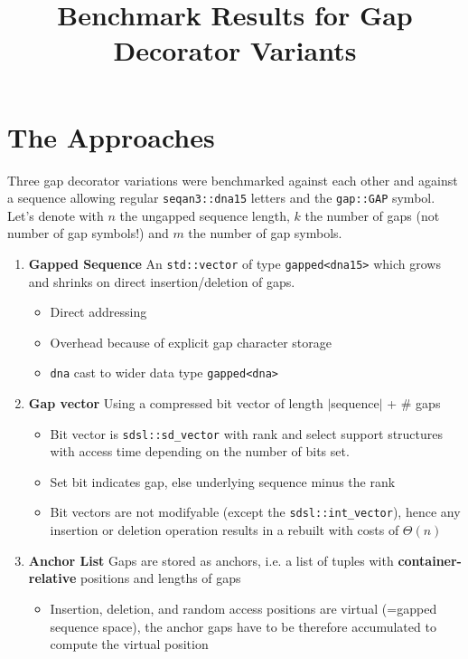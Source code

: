 \documentclass[11pt, letterpaper, twoside]{article}
\begin{document}
\title{Benchmark Results for Gap Decorator Variants}
\maketitle 

\section{The Approaches}
Three gap decorator variations were benchmarked against each other and against a sequence allowing regular \verb|seqan3::dna15| letters and the \verb|gap::GAP| symbol. Let's denote with $n$ the ungapped sequence length, $k$ the number of gaps (not number of gap symbols!) and $m$ the number of gap symbols. 
\begin{enumerate}
    \item {\bf Gapped Sequence} An \verb|std::vector| of type \verb|gapped<dna15>| which grows and shrinks on direct insertion/deletion of gaps.
	\begin{itemize}
		\item Direct addressing
		\item Overhead because of explicit gap character storage
		\item \verb|dna| cast to wider data type \verb|gapped<dna>|
	\end{itemize}
    \item {\bf Gap vector} Using a compressed bit vector of length $|$sequence$|$ + \# gaps
    \begin{itemize}
        \item Bit vector is \verb|sdsl::sd_vector| with rank and select support structures with access time depending on the number of bits set.
        \item Set bit indicates gap, else underlying sequence minus the rank
        \item Bit vectors are not modifyable (except the \verb|sdsl::int_vector|), hence any insertion or deletion operation results in a rebuilt with costs of $\Theta(n)$
    \end{itemize}
    \item {\bf Anchor List} Gaps are stored as anchors, i.e. a list of tuples with {\bf container-relative} positions and lengths of gaps
    \begin{itemize}
        \item Insertion, deletion, and random access positions are virtual (=gapped sequence space), the anchor gaps have to be therefore accumulated to compute the virtual position

\end{itemize}
\end{enumerate}
\end{document}
